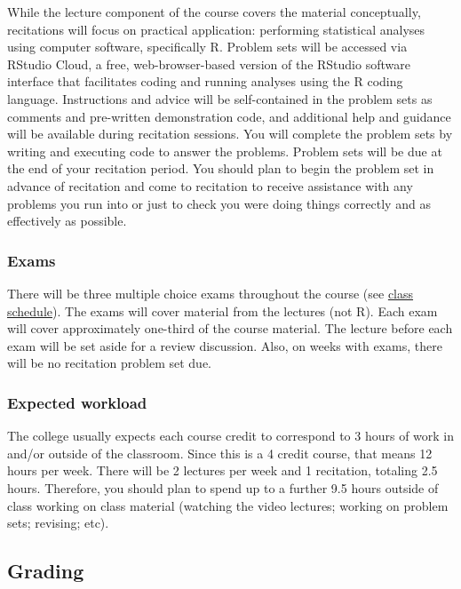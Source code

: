 \documentclass[
  letterpaper,
  DIV=11,
  numbers=noendperiod]{scrartcl}
\begin{document}
While the lecture component of the course covers the material
conceptually, recitations will focus on practical application:
performing statistical analyses using computer software, specifically R.
Problem sets will be accessed via RStudio Cloud, a free,
web-browser-based version of the RStudio software interface that
facilitates coding and running analyses using the R coding language.
Instructions and advice will be self-contained in the problem sets as
comments and pre-written demonstration code, and additional help and
guidance will be available during recitation sessions. You will complete
the problem sets by writing and executing code to answer the problems.
Problem sets will be due at the end of your recitation period. You
should plan to begin the problem set in advance of recitation and come
to recitation to receive assistance with any problems you run into or
just to check you were doing things correctly and as effectively as
possible.

\hypertarget{exams}{%
\subsubsection{Exams}\label{exams}}

There will be three multiple choice exams throughout the course (see
\protect\hyperlink{class-schedule}{class schedule}). The exams will
cover material from the lectures (not R). Each exam will cover
approximately one-third of the course material. The lecture before each
exam will be set aside for a review discussion. Also, on weeks with
exams, there will be no recitation problem set due.

\hypertarget{expected-workload}{%
\subsubsection{Expected workload}\label{expected-workload}}

The college usually expects each course credit to correspond to 3 hours
of work in and/or outside of the classroom. Since this is a 4 credit
course, that means 12 hours per week. There will be 2 lectures per week
and 1 recitation, totaling 2.5 hours. Therefore, you should plan to
spend up to a further 9.5 hours outside of class working on class
material (watching the video lectures; working on problem sets;
revising; etc).

\hypertarget{grading}{%
\subsection{Grading}\label{grading}}
\end{document}
